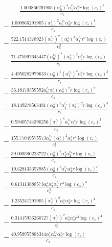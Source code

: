 \documentclass[10pt]{article}
\begin{document}
\begin{align*}
\phantom{R_{3,9}} &\phantom{={}}{}  - \frac{1.000866291905 \left(\alpha_{0}^s\right)^{4} \alpha_{1}^{c_s} \alpha_{1}^s r \log{\left(c_{s} \right)}^{4}}{c_{s}} \\
&{}  - \frac{1.000866291905 \left(\alpha_{0}^s\right)^{2} \alpha_{1}^{c_s} \alpha_{3}^s r \log{\left(c_{s} \right)}^{4}}{c_{s}} \\
&{}  - \frac{522.1514378923 \left(\alpha_{0}^{c_s}\right)^{2} \left(\alpha_{0}^s\right)^{3} \alpha_{1}^{c_s} r^{2} \log{\left(c_{s} \right)}}{c_{s}^{2}} \\
&{}  - \frac{71.475992645447 \left(\alpha_{0}^{c_s}\right)^{4} \left(\alpha_{0}^s\right)^{2} \alpha_{1}^s r \log{\left(c_{s} \right)}}{c_{s}} \\
&{}  - \frac{4.4950282979633 \left(\alpha_{0}^s\right)^{2} \left(\alpha_{1}^{c_s}\right)^{2} \alpha_{1}^s r \log{\left(c_{s} \right)}^{3}}{c_{s}} \\
&{}  - \frac{36.18170359592 \alpha_{0}^{c_s} \alpha_{0}^s \left(\alpha_{2}^s\right)^{2} r \log{\left(c_{s} \right)}^{2}}{c_{s}} \\
&{}  - \frac{18.149278563481 \left(\alpha_{0}^s\right)^{2} \alpha_{1}^{c_s} \left(\alpha_{1}^s\right)^{2} r \log{\left(c_{s} \right)}^{3}}{c_{s}} \\
&{}  - \frac{0.59405744390256 \left(\alpha_{0}^{c_s}\right)^{4} \alpha_{1}^{c_s} \alpha_{1}^s r \log{\left(c_{s} \right)}^{2}}{c_{s}} \\
&{}  - \frac{155.77049575573 \alpha_{0}^{c_s} \left(\alpha_{0}^s\right)^{2} \alpha_{1}^s r^{4} \log{\left(c_{s} \right)}}{c_{s}^{4}} \\
&{}  - \frac{39.009380223722 \left(\alpha_{0}^s\right)^{3} \alpha_{1}^s \alpha_{2}^{c_s} r \log{\left(c_{s} \right)}}{c_{s}} \\
&{}  - \frac{19.628133357985 \left(\alpha_{0}^s\right)^{2} \alpha_{1}^{c_s} \alpha_{3}^s r \log{\left(c_{s} \right)}^{2}}{c_{s}} \\
&{}  - \frac{0.613413888573 \alpha_{0}^s \alpha_{1}^s \alpha_{2}^{c_s} r^{3} \log{\left(c_{s} \right)}^{3}}{c_{s}^{3}} \\
&{}  - \frac{1.235241291905 \left(\alpha_{0}^{c_s}\right)^{2} \alpha_{1}^s \alpha_{3}^s r \log{\left(c_{s} \right)}^{4}}{c_{s}} \\
&{}  - \frac{0.31415936260727 \left(\alpha_{0}^{c_s}\right)^{2} \alpha_{0}^s \alpha_{2}^s r^{3} \log{\left(c_{s} \right)}^{4}}{c_{s}^{3}} \\
&{}  - \frac{40.958955888344 \alpha_{1}^s \alpha_{2}^{c_s} \alpha_{2}^s r \log{\left(c_{s} \right)}}{c_{s}} \\

\end{align*}
\end{document}
